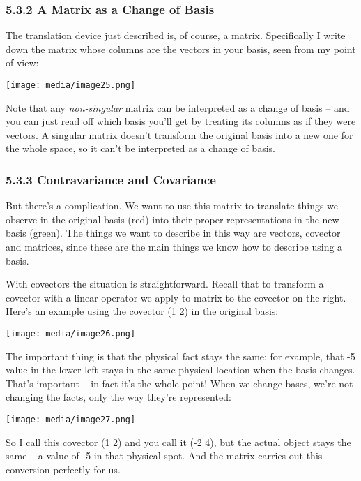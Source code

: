 \documentclass[oneside,english]{amsbook}
\numberwithin{section}{chapter}
\theoremstyle{plain}
\theoremstyle{definition}
\begin{document}
\subsubsection{5.3.2 A Matrix as a Change of
	Basis}\label{a-matrix-as-a-change-of-basis}

The translation device just described is, of course, a matrix.
Specifically I write down the matrix whose columns are the vectors in
your basis, seen from my point of view:

\texttt{[image: media/image25.png]}

Note that any \emph{non-singular} matrix can be interpreted as a change
of basis -- and you can just read off which basis you'll get by treating
its columns as if they were vectors. A singular matrix doesn't transform
the original basis into a new one for the whole space, so it can't be
interpreted as a change of basis.

\subsubsection{5.3.3 Contravariance and
	Covariance}\label{contravariance-and-covariance}

But there's a complication. We want to use this matrix to translate
things we observe in the original basis (red) into their proper
representations in the new basis (green). The things we want to describe
in this way are vectors, covector and matrices, since these are the main
things we know how to describe using a basis.

With covectors the situation is straightforward. Recall that to
transform a covector with a linear operator we apply to matrix to the
covector on the right. Here's an example using the covector (1 2) in the
original basis:

\texttt{[image: media/image26.png]}

The important thing is that the physical fact stays the same: for
example, that -5 value in the lower left stays in the same physical
location when the basis changes. That's important -- in fact it's the
whole point! When we change bases, we're not changing the facts, only
the way they're represented:

\texttt{[image: media/image27.png]}

So I call this covector (1 2) and you call it (-2 4), but the actual
object stays the same -- a value of -5 in that physical spot. And the
matrix carries out this conversion perfectly for us.
\end{document}
